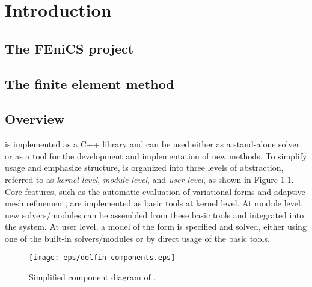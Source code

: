 \chapter{Introduction}



\section{The FEniCS project}


\section{The finite element method}


\section{Overview}

\dolfin{} is implemented as a C++ library and can be used either as a
stand-alone solver, or as a tool for the development and
implementation of new methods. To simplify usage and emphasize
structure, \dolfin{} is organized into three levels of abstraction,
referred to as \emph{kernel level}, \emph{module level}, and
\emph{user level}, as shown in Figure \ref{fig:components}.  Core
features, such as the automatic evaluation of variational forms and
adaptive mesh refinement, are implemented as basic tools at kernel
level. At module level, new solvers/modules can be assembled from
these basic tools and integrated into the system. At user level, a
model of the form is specified and solved, either using one of the
built-in solvers/modules or by direct usage of the basic tools.

\begin{figure}[htbp]
  \begin{center}
    \texttt{[image: eps/dolfin-components.eps]}
    \caption{Simplified component diagram of \dolfin{}.}
    \label{fig:components}
  \end{center}
\end{figure}
